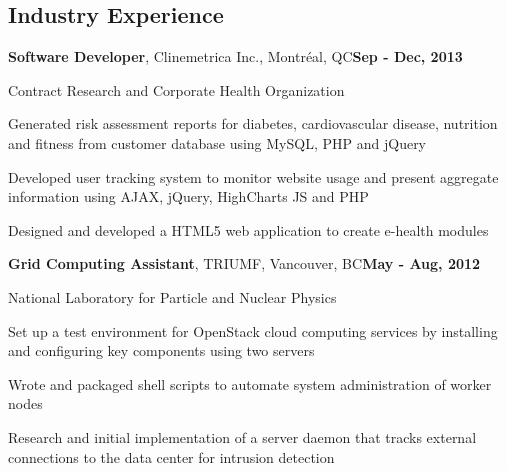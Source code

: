 \documentclass[margin,line]{res}
\newenvironment{list1}{
  \begin{list}{\ding{113}}{
      \setlength{\itemsep}{0in}
      \setlength{\parsep}{0in} \setlength{\parskip}{0in}
      \setlength{\topsep}{0in} \setlength{\partopsep}{0in} 
      \setlength{\leftmargin}{0.17in}}}{\end{list}}
\newenvironment{list3}{
  \begin{list}{\textopenbullet}{
      \setlength{\itemsep}{0in}
      \setlength{\parsep}{0in} \setlength{\parskip}{0in}
      \setlength{\topsep}{0in} \setlength{\partopsep}{0in} 
      \setlength{\leftmargin}{0.1in}}}{\end{list}}
\begin{document}
\begin{resume}
\vspace*{.4cm}

\section{\sc Industry Experience}

{\bf Software Developer}, Clinemetrica Inc., Montr\'eal, QC\hfill{\bf Sep - Dec, 2013}\\
\vspace*{-.2cm}
\begin{list1}
\item[] Contract Research and Corporate Health Organization
\vspace*{.2cm}
\begin{list3}
\setlength\itemsep{0.5em}
\item Generated risk assessment reports for diabetes, cardiovascular disease, nutrition and fitness from customer database using MySQL, PHP and jQuery 
\item Developed user tracking system to monitor website usage and present aggregate information using AJAX, jQuery, HighCharts JS and PHP
\item Designed and developed a HTML5 web application to create e-health modules
\end{list3}
\end{list1}
\vspace*{.1cm}

{\bf Grid Computing Assistant}, TRIUMF, Vancouver, BC\hfill{\bf May - Aug, 2012}\\
\vspace*{-.2cm}
\begin{list1}
\item[] National Laboratory for Particle and Nuclear Physics
\vspace*{.2cm}
\begin{list3}
\setlength\itemsep{0.5em}
\item Set up a test environment for OpenStack cloud computing services by installing and configuring key components using two servers
\item Wrote and packaged shell scripts to automate system administration of worker nodes
\item Research and initial implementation of a server daemon that tracks external connections to the data center for intrusion detection
\end{list3}
\end{list1}
\vspace*{.1cm}


\end{resume}
\end{document}
